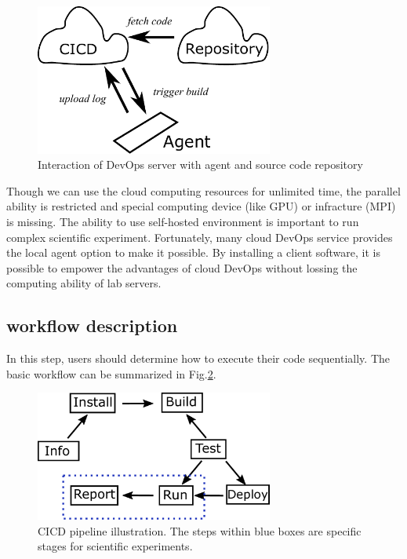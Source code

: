 \documentclass{IEEEcsmag}
\begin{document}
\begin{figure}[!ht]
\centerline{\includegraphics[width=18.5pc]{principal.pdf}}
\caption{Interaction of DevOps server with agent and source code repository}\label{fig:selfhosted}
\end{figure}

Though we can use the cloud computing resources for unlimited time, the parallel ability is restricted and special computing device (like GPU) or infracture (MPI) is missing. The ability to use self-hosted environment is important to run complex scientific experiment. Fortunately, many cloud DevOps service provides the local agent option to make it possible. By installing a client software, it is possible to empower the advantages of cloud DevOps without lossing the computing ability of lab servers. 
\subsection{workflow description}
In this step, users should determine how to execute their code sequentially. The basic workflow can be summarized in Fig.\ref{fig:cicdworkflow}.

\begin{figure}[!ht]
\centerline{\includegraphics[width=18.5pc]{workflow.pdf}}
\caption{CICD pipeline illustration. The steps within blue boxes are specific stages for scientific experiments. }\label{fig:cicdworkflow}
\end{figure}
\end{document}
